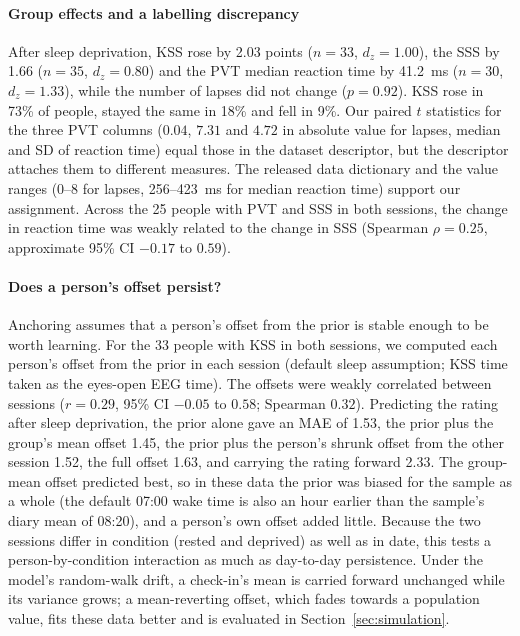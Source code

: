 \paragraph*{Group effects and a labelling discrepancy} After sleep deprivation, KSS rose by 2.03 points ($n = 33$, $d_z = 1.00$), the SSS by 1.66 ($n = 35$, $d_z = 0.80$) and the PVT median reaction time by 41.2~ms ($n = 30$, $d_z = 1.33$), while the number of lapses did not change ($p = 0.92$). KSS rose in 73\% of people, stayed the same in 18\% and fell in 9\%. Our paired $t$ statistics for the three PVT columns ($0.04$, $7.31$ and $4.72$ in absolute value for lapses, median and SD of reaction time) equal those in the dataset descriptor, but the descriptor attaches them to different measures. The released data dictionary and the value ranges (0--8 for lapses, 256--423~ms for median reaction time) support our assignment. Across the 25 people with PVT and SSS in both sessions, the change in reaction time was weakly related to the change in SSS (Spearman $\rho = 0.25$, approximate 95\% CI $-0.17$ to $0.59$).

\paragraph*{Does a person's offset persist?} Anchoring assumes that a person's offset from the prior is stable enough to be worth learning. For the 33 people with KSS in both sessions, we computed each person's offset from the prior in each session (default sleep assumption; KSS time taken as the eyes-open EEG time). The offsets were weakly correlated between sessions ($r = 0.29$, 95\% CI $-0.05$ to $0.58$; Spearman $0.32$). Predicting the rating after sleep deprivation, the prior alone gave an MAE of 1.53, the prior plus the group's mean offset 1.45, the prior plus the person's shrunk offset from the other session 1.52, the full offset 1.63, and carrying the rating forward 2.33. The group-mean offset predicted best, so in these data the prior was biased for the sample as a whole (the default 07:00 wake time is also an hour earlier than the sample's diary mean of 08:20), and a person's own offset added little. Because the two sessions differ in condition (rested and deprived) as well as in date, this tests a person-by-condition interaction as much as day-to-day persistence. Under the model's random-walk drift, a check-in's mean is carried forward unchanged while its variance grows; a mean-reverting offset, which fades towards a population value, fits these data better and is evaluated in Section~\ref{sec:simulation}.

